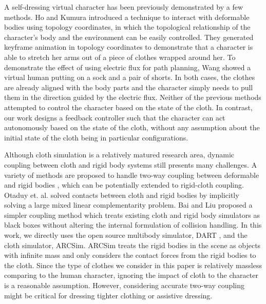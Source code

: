 A self-dressing virtual character has been previously demonstrated by a few methods. Ho and Kumura  introduced a technique to interact with deformable bodies using topology coordinates, in which the topological relationship of the character's body and the environment can be easily controlled. They generated keyframe animation in topology coordinates to demonstrate that a character is able to stretch her arms out of a piece of clothes wrapped around her. To demonstrate the effect of using electric flux for path planning, Wang \etal {} showed a virtual human putting on a sock and a pair of shorts. In both cases, the clothes are already aligned with the body parts and the character simply needs to pull them in the direction guided by the electric flux. Neither of the previous methods attempted to control the character based on the state of the cloth. In contrast, our work designs a feedback controller such that the character can act autonomously based on the state of the cloth, without any assumption about the initial state of the cloth being in particular configurations.


Although cloth simulation is a relatively matured research area, dynamic coupling between cloth and rigid body systems still presents many challenges. A variety of methods are proposed to handle two-way coupling between deformable and rigid bodies \cite{Jansson:2003:CDR,Sifakis:2007:HSD,Shinar:2008:TCR,Otaduy:2009:ICH,garre2011interactive}, which can be potentially extended to rigid-cloth coupling. Otaduy et. al. \cite{Otaduy:2009:ICH} solved contacts between cloth and rigid bodies by implicitly solving a large mixed linear complementarity problem. Bai and Liu \cite{Bai:2014:CCR} proposed a simpler coupling method which treats existing cloth and rigid body simulators as black boxes without altering the internal formulation of collision handling. In this work, we directly uses the open source multibody simulator, DART \cite{Liu:2012:STM}, and the cloth simulator, ARCSim\cite{Narain:2012:AAR,Narain:2013:FCA}. ARCSim treats the rigid bodies in the scene as objects with infinite mass and only considers the contact forces from the rigid bodies to the cloth. Since the type of clothes we consider in this paper is relatively massless comparing to the human character, ignoring the impact of cloth to the character is a reasonable assumption. However, considering accurate two-way coupling might be critical for dressing tighter clothing or assistive dressing.

